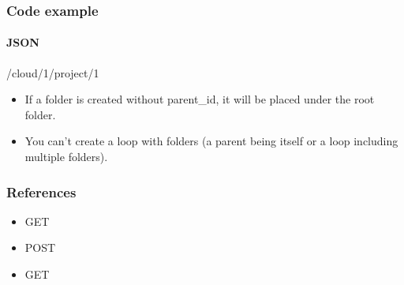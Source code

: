 \documentclass[a4paper,12pt,english]{sphinxmanual}
\begin{document}
\subsubsection{Code example}
\label{\detokenize{concepts/folders_and_documents:code-example}}

\paragraph{JSON}
\label{\detokenize{concepts/folders_and_documents:json}}
/cloud/1/project/1

%
\begin{sphinxVerbatim}[commandchars=\\\{\}]
     
     
     
     
     
     
     
\end{sphinxVerbatim}
\begin{itemize}
\item {} 
If a folder is created without parent\_id, it will be placed under the root folder.

\item {} 
You can’t create a loop with folders (a parent being itself or a loop including multiple folders).

\end{itemize}


\subsubsection{References}
\label{\detokenize{concepts/folders_and_documents:references}}\begin{itemize}
\item {} 
GET 

\item {} 
POST 

\item {} 
GET 

\end{itemize}
\end{document}
